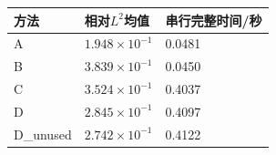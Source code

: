\begin{tabular}{lll}\toprule
方法 & 相对$L^2$均值 & 串行完整时间/秒 \\ \midrule
A & $1.948\times10^{-1}$ & 0.0481 \\
B & $3.839\times10^{-1}$ & 0.0450 \\
C & $3.524\times10^{-1}$ & 0.4037 \\
D & $2.845\times10^{-1}$ & 0.4097 \\
D\_unused & $2.742\times10^{-1}$ & 0.4122 \\
\bottomrule\end{tabular}
